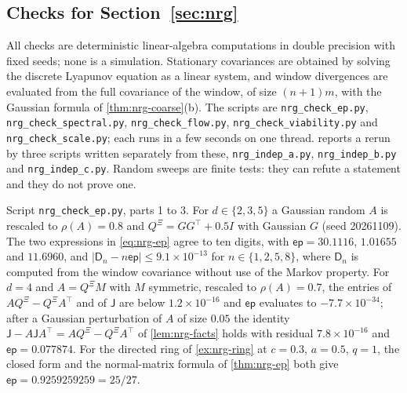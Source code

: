 \subsection{Checks for \texorpdfstring{Section~\ref{sec:nrg}}{energetic viability}}\label{chk:nrg}

All checks are deterministic linear-algebra computations in double precision with fixed seeds; none is a simulation. Stationary covariances are obtained by solving the discrete Lyapunov equation as a linear system, and window divergences are evaluated from the full covariance of the window, of size $(n+1)m$, with the Gaussian formula of \cref{thm:nrg-coarse}(b). The scripts are \texttt{nrg\_\allowbreak check\_\allowbreak ep.py}, \texttt{nrg\_\allowbreak check\_\allowbreak spectral.py}, \texttt{nrg\_\allowbreak check\_\allowbreak flow.py}, \texttt{nrg\_\allowbreak check\_\allowbreak viability.py} and \texttt{nrg\_\allowbreak check\_\allowbreak scale.py}; each runs in a few seconds on one thread.  reports a rerun by three scripts written separately from these, \texttt{nrg\_\allowbreak indep\_\allowbreak a.py}, \texttt{nrg\_\allowbreak indep\_\allowbreak b.py} and \texttt{nrg\_\allowbreak indep\_\allowbreak c.py}. Random sweeps are finite tests: they can refute a statement and they do not prove one.

\begin{numcheck}\label{chk:nrg-ep}
Script \texttt{nrg\_\allowbreak check\_\allowbreak ep.py}, parts 1 to 3. For $d\in\{2,3,5\}$ a Gaussian random $A$ is rescaled to $\rho(A)=0.8$ and $Q^{\Xi}=GG^\top+0.5I$ with Gaussian $G$ (seed 20261109). The two expressions in \cref{eq:nrg-ep} agree to ten digits, with $\mathsf{ep}=30.1116$, $1.01655$ and $11.6960$, and $\vert\mathsf D_n-n\mathsf{ep}\vert\le9.1\times10^{-13}$ for $n\in\{1,2,5,8\}$, where $\mathsf D_n$ is computed from the window covariance without use of the Markov property. For $d=4$ and $A=Q^{\Xi}M$ with $M$ symmetric, rescaled to $\rho(A)=0.7$, the entries of $AQ^{\Xi}-Q^{\Xi}A^\top$ and of $\mathsf J$ are below $1.2\times10^{-16}$ and $\mathsf{ep}$ evaluates to $-7.7\times10^{-34}$; after a Gaussian perturbation of $A$ of size $0.05$ the identity $\mathsf J-A\mathsf JA^\top=AQ^{\Xi}-Q^{\Xi}A^\top$ of \cref{lem:nrg-facts} holds with residual $7.8\times10^{-16}$ and $\mathsf{ep}=0.077874$. For the directed ring of \cref{ex:nrg-ring} at $c=0.3$, $a=0.5$, $q=1$, the closed form and the normal-matrix formula of \cref{thm:nrg-ep} both give $\mathsf{ep}=0.9259259259=25/27$.
\end{numcheck}


